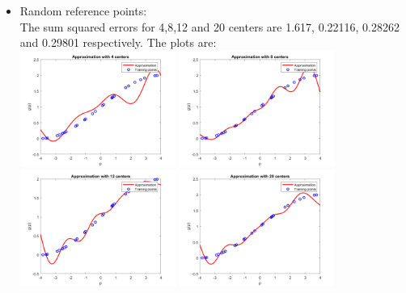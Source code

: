 \documentclass{article}
\begin{document}
\begin{itemize}
	\item Random reference points: \\
	The sum squared errors for 4,8,12 and 20 centers are 1.617, 0.22116, 0.28262 and 0.29801 respectively. The plots are: \\
	\includegraphics[width=0.4\textwidth]{Problem2_4_random.png}
	\includegraphics[width=0.4\textwidth]{Problem2_8_random.png} \\
	\includegraphics[width=0.4\textwidth]{Problem2_12_random.png}
	\includegraphics[width=0.4\textwidth]{Problem2_20_random.png}


\end{itemize}
\end{document}
